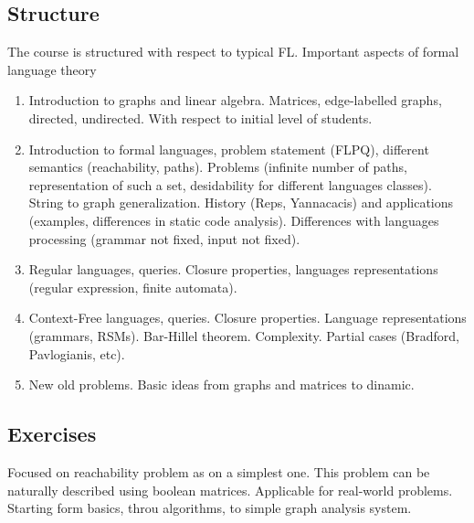 \documentclass[sigconf]{acmart}
\begin{document}
\subsection{Structure}
The course is structured with respect to typical FL. Important aspects of formal language theory  
\begin{enumerate}
  \item Introduction to graphs and linear algebra. Matrices, edge-labelled graphs, directed, undirected. With respect to initial level of students.
  \item Introduction to formal languages, problem statement (FLPQ), different semantics (reachability, paths). Problems (infinite number of paths, representation of such a set, desidability for different languages classes). String to graph generalization. History (Reps, Yannacacis) and applications (examples, differences in static code analysis). Differences with languages processing (grammar not fixed, input not fixed).
  \item Regular languages, queries. Closure properties, languages representations (regular expression, finite automata).
  \item Context-Free languages, queries. Closure properties. Language representations (grammars, RSMs). Bar-Hillel theorem. Complexity. Partial cases (Bradford, Pavlogianis, etc).
  \item New old problems. Basic ideas from graphs and matrices to dinamic. 
\end{enumerate}

\subsection{Exercises}

Focused on reachability problem as on a simplest one. This problem can be naturally described using boolean matrices. Applicable for real-world problems. Starting form basics, throu algorithms, to simple graph analysis system.
\end{document}
